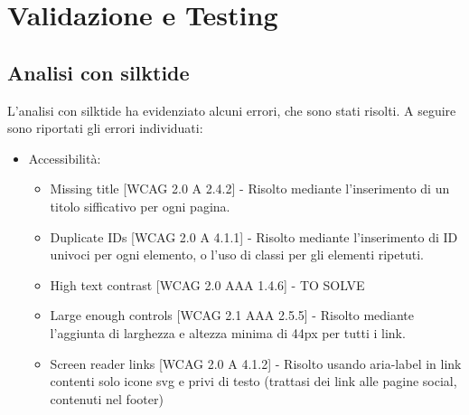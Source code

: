 \section{Validazione e Testing}
\subsection{Analisi con silktide}
L'analisi con silktide ha evidenziato alcuni errori, che sono stati risolti. A seguire sono riportati gli errori individuati:
\begin{itemize}
    \item Accessibilità:
    \begin{itemize}
        \item Missing title [WCAG 2.0 A 2.4.2] - Risolto mediante l'inserimento di un titolo sifficativo per ogni pagina.
        \item Duplicate IDs [WCAG 2.0 A 4.1.1] - Risolto mediante l'inserimento di ID univoci per ogni elemento, o l'uso di classi per gli elementi ripetuti.
        \item High text contrast [WCAG 2.0 AAA 1.4.6] - TO SOLVE
        \item Large enough controls [WCAG 2.1 AAA 2.5.5] - Risolto mediante l'aggiunta di larghezza e altezza minima di 44px per tutti i link.
        \item Screen reader links [WCAG 2.0 A 4.1.2] - Risolto usando aria-label in link contenti solo icone svg e privi di testo (trattasi dei link alle pagine social, contenuti nel footer)
    \end{itemize}

\end{itemize}

